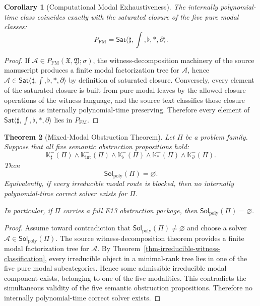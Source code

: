 \documentclass[11pt]{article}
\newtheorem{theorem}{Theorem}[section]
\newtheorem{corollary}[theorem]{Corollary}
\theoremstyle{definition}
\theoremstyle{remark}
\newcommand{\FM}{\mathrm{FM}}
\newcommand{\PFM}{P_{\mathrm{FM}}}
\newcommand{\SatClosure}{\mathsf{Sat}\langle \sharp,\int,\flat,\ast,\partial\rangle}
\newcommand{\Solpoly}{\mathsf{Sol}_{\mathrm{poly}}}
\begin{document}
\begin{corollary}[Computational Modal Exhaustiveness]\label{cor-computational-modal-exhaustiveness}
The internally polynomial-time class coincides exactly with the saturated closure of the five pure modal classes:
\[
\PFM = \SatClosure.
\]
\end{corollary}

\begin{proof}
If $\mathcal A \in P_{\FM}(\mathfrak X, \mathfrak Y; \sigma)$, the witness-decomposition machinery of the source manuscript produces a finite modal factorization tree for $\mathcal A$, hence $\mathcal A \in \SatClosure$ by definition of saturated closure. Conversely, every element of the saturated closure is built from pure modal leaves by the allowed closure operations of the witness language, and the source text classifies those closure operations as internally polynomial-time preserving. Therefore every element of $\SatClosure$ lies in $\PFM$.
\end{proof}

\begin{theorem}[Mixed-Modal Obstruction Theorem]\label{thm-mixed-modal-obstruction}
Let $\Pi$ be a problem family. Suppose that all five semantic obstruction propositions hold:
\[
\mathbb K_\sharp^-(\Pi)
\wedge
\mathbb K_{\mathrm{int}}^-(\Pi)
\wedge
\mathbb K_\flat^-(\Pi)
\wedge
\mathbb K_\ast^-(\Pi)
\wedge
\mathbb K_\partial^-(\Pi).
\]
Then
\[
\Solpoly(\Pi) = \varnothing.
\]
Equivalently, if every irreducible modal route is blocked, then no internally polynomial-time correct solver exists for $\Pi$.

In particular, if $\Pi$ carries a full E13 obstruction package, then $\Solpoly(\Pi) = \varnothing$.
\end{theorem}

\begin{proof}
Assume toward contradiction that $\Solpoly(\Pi) \neq \varnothing$ and choose a solver $\mathcal A \in \Solpoly(\Pi)$. The source witness-decomposition theorem provides a finite modal factorization tree for $\mathcal A$. By Theorem~\ref{thm-irreducible-witness-classification}, every irreducible object in a minimal-rank tree lies in one of the five pure modal subcategories. Hence some admissible irreducible modal component exists, belonging to one of the five modalities. This contradicts the simultaneous validity of the five semantic obstruction propositions. Therefore no internally polynomial-time correct solver exists.
\end{proof}
\end{document}

